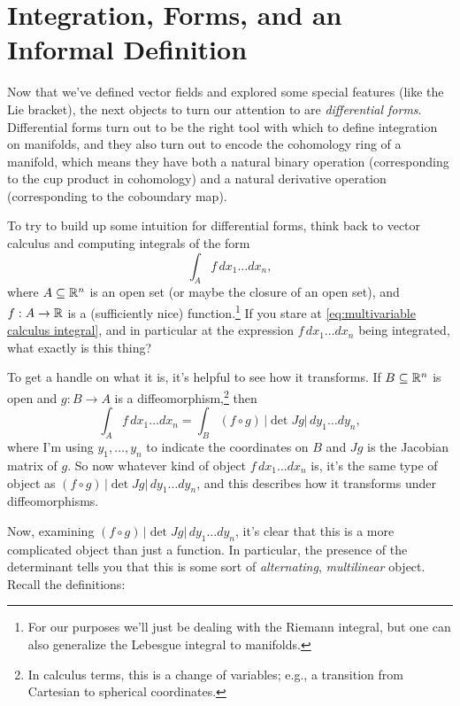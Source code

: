 
\section{Integration, Forms, and an Informal Definition}
\label{sec:informal def of forms}


Now that we've defined vector fields and explored some special features (like the Lie bracket), the next objects to turn our attention to are \emph{differential forms}. Differential forms turn out to be the right tool with which to define integration on manifolds, and they also turn out to encode the cohomology ring of a manifold, which means they have both a natural binary operation (corresponding to the cup product in cohomology) and a natural derivative operation (corresponding to the coboundary map).

To try to build up some intuition for differential forms, think back to vector calculus and computing integrals of the form
\begin{equation}\label{eq:multivariable calculus integral}
	\int_A f\, dx_1 \dots dx_n,
\end{equation}
where $A \subseteq \mathbb{R}^n$ is an open set (or maybe the closure of an open set), and $f: A \to \mathbb{R}$ is a (sufficiently nice) function.\footnote{For our purposes we'll just be dealing with the Riemann integral, but one can also generalize the Lebesgue integral to manifolds.} If you stare at \eqref{eq:multivariable calculus integral}, and in particular at the expression $f\, dx_1 \dots dx_n$ being integrated, what exactly is this thing?

To get a handle on what it is, it's helpful to see how it transforms. If $B \subseteq \mathbb{R}^n$ is open and $g: B \to A$ is a diffeomorphism,\footnote{In calculus terms, this is a change of variables; e.g., a transition from Cartesian to spherical coordinates.} then
\[
	\int_A f\, dx_1 \dots dx_n = \int_B (f \circ g) \,|\!\det Jg|\, dy_1 \dots dy_n,
\]
where I'm using $y_1, \dots , y_n$ to indicate the coordinates on $B$ and $Jg$ is the Jacobian matrix of $g$. So now whatever kind of object $f\, dx_1 \dots dx_n$ is, it's the same type of object as $(f \circ g) \,|\!\det Jg|\, dy_1 \dots dy_n$, and this describes how it transforms under diffeomorphisms.

Now, examining $(f \circ g)\, |\!\det Jg|\, dy_1 \dots dy_n$, it's clear that this is a more complicated object than just a function. In particular, the presence of the determinant tells you that this is some sort of \emph{alternating}, \emph{multilinear} object. Recall the definitions:


